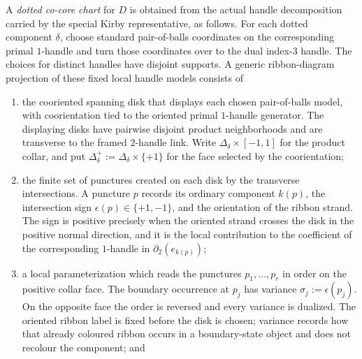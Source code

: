 \begin{definition}
\label{def:dotted-cut-system}
A \emph{dotted co-core chart} for $D$ is obtained from the actual handle
decomposition carried by the special Kirby representative, as follows.  For
each dotted component $\delta$, choose standard pair-of-balls coordinates on
the corresponding primal $1$-handle and turn those coordinates over to the
dual index-$3$ handle.  The choices for distinct handles have disjoint
supports.  A generic ribbon-diagram projection of these fixed local handle
models consists of
\begin{enumerate}[label=(\roman*),ref=\roman*]
\item\label{item:cut-disks}
  the cooriented spanning disk that displays each chosen pair-of-balls model,
  with coorientation tied to the oriented primal $1$-handle generator.  The
  displaying disks have pairwise disjoint product neighborhoods and are
  transverse to the framed $2$-handle link.  Write
  $\Delta_\delta\times[-1,1]$ for the product collar, and put
  $\Delta_\delta^+:=\Delta_\delta\times\{+1\}$ for the face selected by the
  coorientation;

  \item\label{item:cut-punctures}
  the finite set of punctures created on each disk by the transverse
  intersections.  A puncture $p$ records its ordinary component $k(p)$,
  the intersection sign $\epsilon(p)\in\{+1,-1\}$, and the orientation of
  the ribbon strand.  The sign is positive precisely when the oriented
  strand crosses the disk in the positive normal direction, and it is the
  local contribution to the coefficient of the corresponding $1$-handle in
  $\partial_2(e_{k(p)})$;

  \item\label{item:cut-order}
  a local parameterization which reads the punctures
  $p_1,\ldots,p_r$ in order on the positive collar face.  The boundary
  occurrence at $p_j$ has variance
  $\sigma_j:=\epsilon(p_j)$.  On the opposite face the order is reversed and
  every variance is dualized.  The oriented ribbon label is fixed before the
  disk is chosen; variance records how that already coloured ribbon occurs in
  a boundary-state object and does not recolour the component; and


\end{enumerate}
\end{definition}
